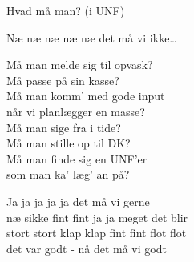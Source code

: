 \begin{song}{Hvad må man? (i UNF)}
  \begin{SBChorus}
    Næ næ næ næ næ det må vi ikke\ldots
  \end{SBChorus}

  \begin{SBVerse}
    Må man melde sig til opvask?\\
    Må passe på sin kasse?\\
    Må man komm’ med gode input\\
    når vi planlægger en masse?\\
    Må man sige fra i tide?\\
    Må man stille op til DK?\\
    Må man finde sig en UNF’er\\
    som man ka’ læg’ an på?
  \end{SBVerse}

  \begin{SBChorus}
    Ja ja ja ja ja det må vi gerne\\
    næ sikke fint fint ja ja meget det blir\\
    stort stort klap klap fint fint flot flot\\
    det var godt - nå det må vi godt
  \end{SBChorus}
\end{song}